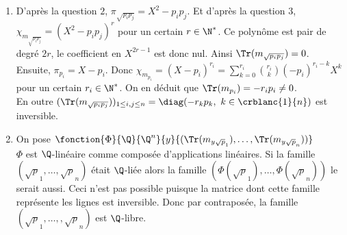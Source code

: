 \documentclass[8pt]{book}
\begin{document}
\begin{enumerate}[leftmargin=*]
		\item D'après la question $2$, $\pi_{\sqrt{p_ip_j}}=X^2-p_ip_j$. Et d'après la question $3$, $\chi_{m_{\sqrt{p_ip_j}}}=(X^2-p_ip_j)^r$ pour un certain $r\in \N^*$. Ce polynôme est pair de degré $2r$, le coefficient en $X^{2r-1}$ est donc nul. Ainsi $\Tr(m_{\sqrt{p_ip_j}})=0$.\\
		Ensuite, $\pi_{p_i}=X-p_i$. Donc $\chi_{m_{p_i}}=(X-p_i)^{r_i}=\displaystyle\sum_{k=0}^{r_i}\binom{r_i}{k}(-p_i)^{r_i-k}X^k$ pour un certain $r_i\in \N^*$. On en déduit que $\Tr(m_{p_i})=-r_ip_i\ne 0$.\\
		En outre $(\Tr(m_{\sqrt{p_ip_j}}))_{1\leq i,j\leq n}=\diag(-r_kp_k,\ k\in \crblanc{1}{n})$ est inversible.
		\item On pose $\fonction{\Phi}{\Q}{\Q^n}{y}{(\Tr(m_{y\sqrt p_1}),\dots,\Tr(m_{y\sqrt p_n}))}$\\
		$\Phi$ est $\Q$-linéaire comme composée d'applications linéaires. Si la famille $(\sqrt p_1,\dots,\sqrt p_n)$ était $\Q$-liée alors la famille $(\Phi(\sqrt p_1),\dots,\Phi(\sqrt p_n))$ le serait aussi. Ceci n'est pas possible puisque la matrice dont cette famille représente les lignes est inversible. Donc par contraposée, la famille $(\sqrt p_1,\dots,,\sqrt p_n)$ est $\Q$-libre.
	\end{enumerate}
	
\end{document}
